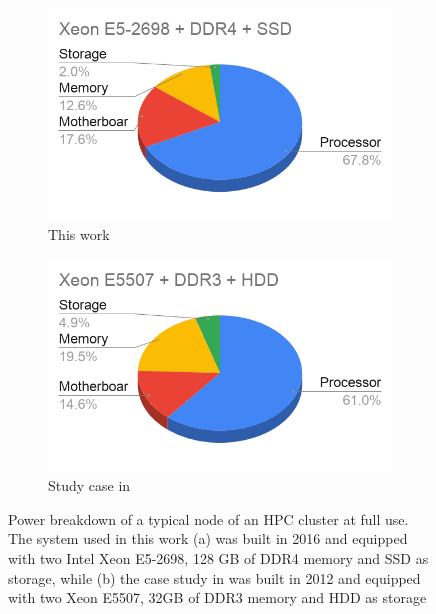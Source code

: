\begin{figure}[ht]
	\centering
	\begin{subfigure}[b]{0.45\textwidth}
		\includegraphics[width=\textwidth]{models/figures/power_breakdown/Xeon E5-2698 + DDR4 + SSD.png}
		\caption{This work}
		\label{fig:1}
	\end{subfigure}
	\begin{subfigure}[b]{0.45\textwidth}
		\includegraphics[width=\textwidth]{models/figures/power_breakdown/Xeon E5507 + DDR3 + HDD.png}
		\caption{Study case in \cite{Malladi2012TowardsDRAM}}
		\label{fig:2}
	\end{subfigure}
	
	\hfill
	\caption{Power breakdown of a typical node of an HPC cluster at full use. The system used in this work (a) was built in 2016 and equipped with two Intel Xeon E5-2698, 128 GB of DDR4 memory and SSD as storage, while (b) the case study in \cite{Malladi2012TowardsDRAM} was built in 2012 and equipped with two Xeon E5507, 32GB of DDR3 memory and HDD as storage}
	\label{fig:powerbreakdown}
\end{figure}

